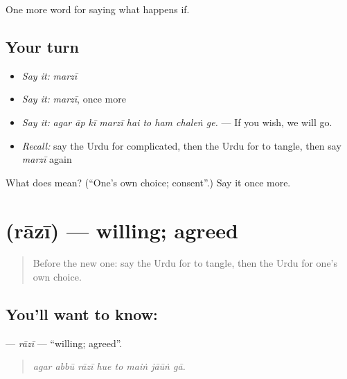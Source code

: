 \begin{grammarlens}[title={What you've built}]
One more word for saying what happens if.
\end{grammarlens}

\subsection*{Your turn}
\begin{itemize}
\raggedright
  \item \emph{Say it:} \emph{marzī}
  \item \emph{Say it:} \emph{marzī}, once more
  \item \emph{Say it:} \emph{agar āp kī marzī hai to ham chaleṅ ge.} — If you wish, we will go.
  \item \emph{Recall:} say the Urdu for complicated, then the Urdu for to tangle, then say \emph{marzī} again
\end{itemize}

\begin{tcolorbox}[breakable,colback=teal!4,colframe=teal!35!black,title={Before you move on}]
What does  mean? (\textquotedblleft{}One's own choice; consent\textquotedblright{}.) Say it once more.
\end{tcolorbox}
\section[\texorpdfstring{\ur{راضی} (rāzī)}{راضی (rāzī)}]{ (rāzī) — willing; agreed}

\label{lesson:UR-C530-razi}



\begin{quote}
Before the new one: say the Urdu for to tangle, then the Urdu for one's own choice.
\end{quote}

\subsection*{You'll want to know: }
\textbf{} — \emph{rāzī} — \textquotedblleft{}willing; agreed\textquotedblright{}.

\begin{quote}
       
\end{quote}

\begin{quote}
\emph{agar abbū rāzī hue to maiṅ jāūṅ gā.}
\end{quote}

